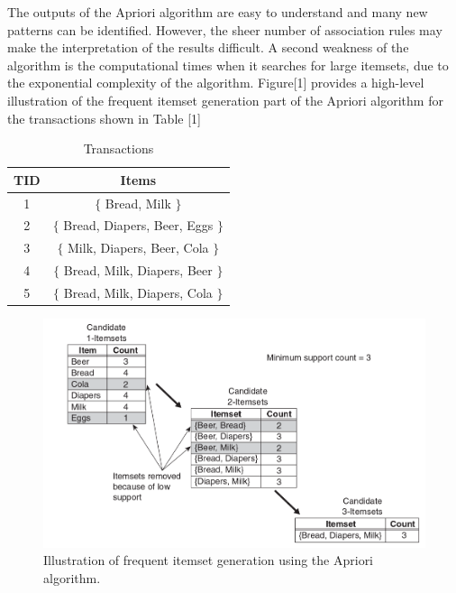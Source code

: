 \documentclass{article}\usepackage[]{graphicx}\usepackage[]{color}
\begin{document}
\hspace{0.5cm}The outputs of the Apriori algorithm are easy to understand and many new patterns can be identified. However, the sheer number of association rules may make the interpretation of the results difficult. A second weakness of the algorithm is the computational times when it searches for large itemsets, due to the exponential complexity of the algorithm. Figure[1] provides a high-level illustration of the frequent itemset generation part of the Apriori algorithm for the transactions shown in Table [1]\\
\begin{table}[t]
\caption{Transactions}
\centering
\begin{tabular}{c|c}
\toprule
TID & Items \\
\midrule
1 & $\{$ Bread, Milk $\}$\\
2 & $\{$ Bread, Diapers, Beer, Eggs $\}$\\
3 & $\{$ Milk, Diapers, Beer, Cola $\}$\\
4 & $\{$ Bread, Milk, Diapers, Beer $\}$\\
5 & $\{$ Bread, Milk, Diapers, Cola $\}$\\
\bottomrule
\end{tabular}
\label{tab2}
\end{table}

\begin{figure}[h]
\begin{center}
\includegraphics [scale=0.35]{apriori.png}
\end{center}
\caption{Illustration of frequent itemset generation using the Apriori algorithm.}
\end{figure}
\end{document}
